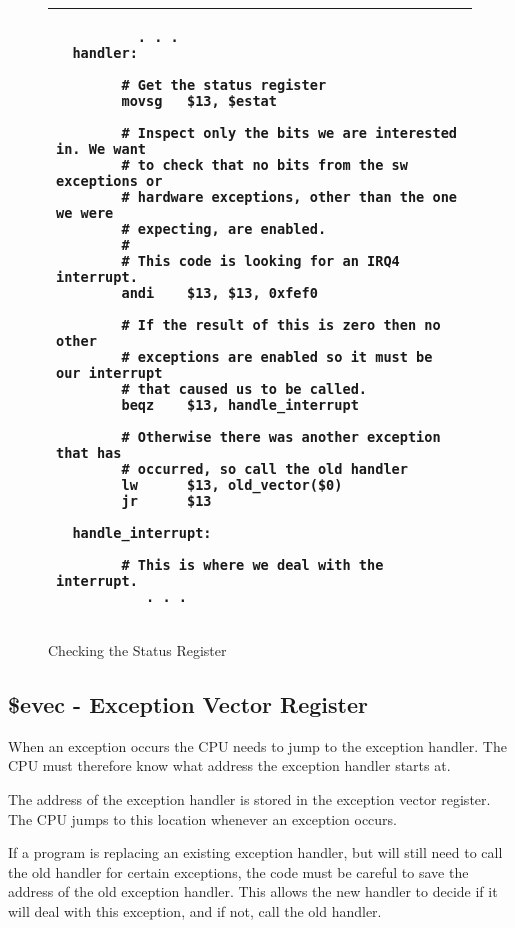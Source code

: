 \begin{figure}[h]
\begin{footnotesize}
\begin{center}
\begin{tabular}{|p{10cm}|}
\hline
\begin{verbatim}
          . . .
  handler:

        # Get the status register
        movsg   $13, $estat

        # Inspect only the bits we are interested in. We want 
        # to check that no bits from the sw exceptions or 
        # hardware exceptions, other than the one we were 
        # expecting, are enabled.
        #
        # This code is looking for an IRQ4 interrupt.
        andi    $13, $13, 0xfef0
         
        # If the result of this is zero then no other 
        # exceptions are enabled so it must be our interrupt
        # that caused us to be called.
        beqz    $13, handle_interrupt 

        # Otherwise there was another exception that has 
        # occurred, so call the old handler
        lw      $13, old_vector($0)
        jr      $13

  handle_interrupt:

        # This is where we deal with the interrupt.
           . . .
\end{verbatim}
\\
\hline
\end{tabular}
\end{center}
\end{footnotesize}
\caption{Checking the Status Register}
\label{code:stat_check}
\end{figure}

\subsection{\$evec - Exception Vector Register}
\label{sec:evec}

When an exception occurs the CPU needs to jump to the exception
handler. The CPU must therefore know what address the exception
handler starts at.

The address of the exception handler is stored in the exception vector
register. The CPU jumps to this location whenever an exception occurs.

If a program is replacing an existing exception handler, but will still
need to call the old handler for certain exceptions, the code must
be careful to save the address of the old exception handler. This
allows the new handler to decide if it will deal with this exception,
and if not, call the old handler.

